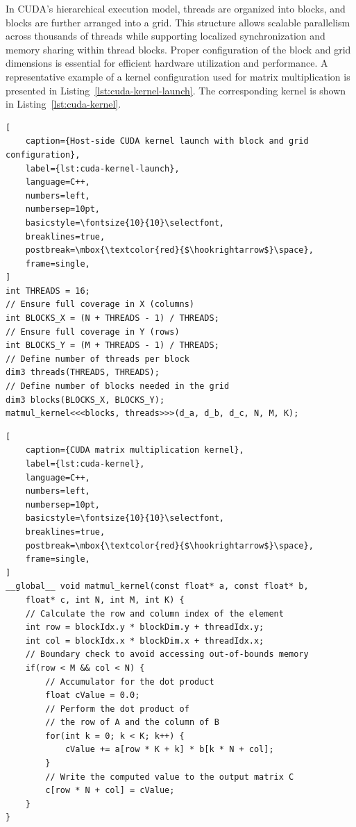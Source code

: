 \documentclass[modern,longauthor]{aastex7}
\begin{document}
In CUDA's hierarchical execution model, threads are organized into blocks, and blocks are further arranged into a grid. This structure allows scalable parallelism across thousands of threads while supporting localized synchronization and memory sharing within thread blocks. Proper configuration of the block and grid dimensions is essential for efficient hardware utilization and performance. A representative example of a kernel configuration used for matrix multiplication is presented in Listing~\ref{lst:cuda-kernel-launch}. The corresponding kernel is shown in Listing~\ref{lst:cuda-kernel}.

\begin{lstlisting}[
    caption={Host-side CUDA kernel launch with block and grid configuration},
    label={lst:cuda-kernel-launch},
    language=C++,
    numbers=left,
    numbersep=10pt,
    basicstyle=\fontsize{10}{10}\selectfont,
    breaklines=true,
    postbreak=\mbox{\textcolor{red}{$\hookrightarrow$}\space},
    frame=single,
]
int THREADS = 16;
// Ensure full coverage in X (columns)
int BLOCKS_X = (N + THREADS - 1) / THREADS;
// Ensure full coverage in Y (rows)
int BLOCKS_Y = (M + THREADS - 1) / THREADS;  
// Define number of threads per block
dim3 threads(THREADS, THREADS);
// Define number of blocks needed in the grid
dim3 blocks(BLOCKS_X, BLOCKS_Y);
matmul_kernel<<<blocks, threads>>>(d_a, d_b, d_c, N, M, K);
\end{lstlisting}

\begin{lstlisting}[
    caption={CUDA matrix multiplication kernel},
    label={lst:cuda-kernel},
    language=C++,
    numbers=left,
    numbersep=10pt,
    basicstyle=\fontsize{10}{10}\selectfont,
    breaklines=true,
    postbreak=\mbox{\textcolor{red}{$\hookrightarrow$}\space},
    frame=single,
]
__global__ void matmul_kernel(const float* a, const float* b, 
    float* c, int N, int M, int K) {
    // Calculate the row and column index of the element
    int row = blockIdx.y * blockDim.y + threadIdx.y;
    int col = blockIdx.x * blockDim.x + threadIdx.x;
    // Boundary check to avoid accessing out-of-bounds memory
    if(row < M && col < N) {
        // Accumulator for the dot product
        float cValue = 0.0;  
        // Perform the dot product of
        // the row of A and the column of B
        for(int k = 0; k < K; k++) {
            cValue += a[row * K + k] * b[k * N + col];
        }
        // Write the computed value to the output matrix C
        c[row * N + col] = cValue;
    }
}
\end{lstlisting}
\end{document}
